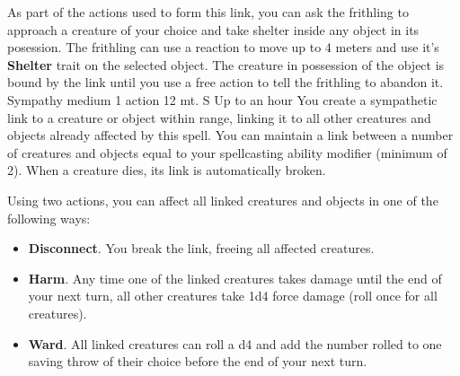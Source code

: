     As part of the actions used to form this link, you can ask the frithling to approach a creature of your choice and take shelter inside any object in its posession.
    The frithling can use a reaction to move up to 4 meters and use it's \textbf{Shelter} trait on the selected object.
    The creature in possession of the object is bound by the link until you use a free action to tell the frithling to abandon it.
    {Sympathy medium}
    {1 action}
    {12 mt.}
    {S}
    {Up to an hour}
    You create a sympathetic link to a creature or object within range, linking it to all other creatures and objects already affected by this spell.
    You can maintain a link between a number of creatures and objects equal to your spellcasting ability modifier (minimum of 2).
    When a creature dies, its link is automatically broken.

    Using two actions, you can affect all linked creatures and objects in one of the following ways:
    \begin{itemize}
        \item \textbf{Disconnect}.
        You break the link, freeing all affected creatures.
        \item \textbf{Harm}.
        Any time one of the linked creatures takes damage until the end of your next turn, all other creatures take 1d4 force damage (roll once for all creatures).
        \item \textbf{Ward}.
        All linked creatures can roll a d4 and add the number rolled to one saving throw of their choice before the end of your next turn.
    \end{itemize}

\newpage~\newpage
